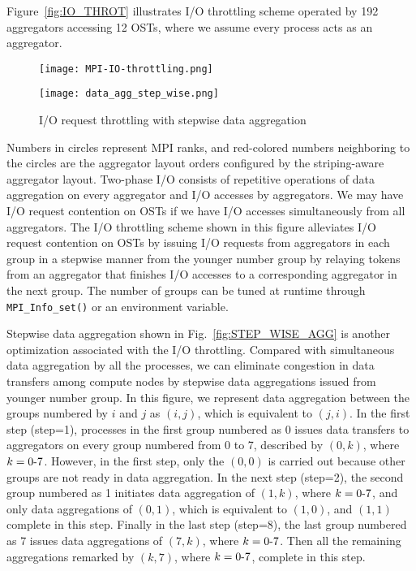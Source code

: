 \documentclass{jhps}
\begin{document}
Figure~\ref{fig:IO_THROT} illustrates
I/O throttling scheme operated by 192 aggregators accessing 12 OSTs,
where we assume every process acts as an aggregator.
%
\begin{figure}[htb]
\centering
\begin{minipage}[b]{0.45\textwidth}
\centering
\texttt{[image: MPI-IO-throttling.png]}
\label{fig:IO_THROT}
\end{minipage}
\noindent
\begin{minipage}[b]{0.45\textwidth}
\centering
\texttt{[image: data\_agg\_step\_wise.png]}
\label{fig:STEP_WISE_AGG}
\end{minipage}
\caption{I/O request throttling with stepwise data aggregation}
\label{fig:IO_THROT_DATA_AGG}
\end{figure}
%
Numbers in circles represent MPI ranks, and red-colored numbers neighboring
to the circles are the aggregator layout orders configured by
the striping-aware aggregator layout.
Two-phase I/O consists of repetitive operations of
data aggregation on every aggregator and I/O accesses by aggregators.
We may have I/O request contention on OSTs
if we have I/O accesses simultaneously from all aggregators.
The I/O throttling scheme shown in this figure alleviates I/O request contention
on OSTs by issuing I/O requests from aggregators in each group in a stepwise manner
from the younger number group by relaying tokens from an aggregator that finishes
I/O accesses to a corresponding aggregator in the next group.
The number of groups can be tuned at runtime through {\tt MPI\_Info\_set()}
or an environment variable.

Stepwise data aggregation shown in
Fig.~\ref{fig:STEP_WISE_AGG}
is another optimization associated with the I/O throttling.
Compared with simultaneous data aggregation by all the processes,
we can eliminate congestion in data transfers among compute nodes
by stepwise data aggregations issued from younger number group.
In this figure, we represent data aggregation between
the groups numbered by $i$ and $j$ as $(i,j)$,
which is equivalent to $(j,i)$.
In the first step (step=1), processes in the first group numbered as 0
issues data transfers to aggregators on every group
numbered from 0 to 7, described by $(0,k)$, where $k=0\mathchar`-7$.
However, in the first step, only the $(0,0)$ is carried out
because other groups are not ready in data aggregation.
In the next step (step=2), the second group numbered as 1 initiates
data aggregation of $(1,k)$, where $k=0\mathchar`-7$,
and only data aggregations of $(0,1)$, which is equivalent to $(1,0)$,
and $(1,1)$ complete in this step.
Finally in the last step (step=8), the last group numbered as 7
issues data aggregations of $(7,k)$, where $k=0\mathchar`-7$.
Then all the remaining aggregations remarked by $(k,7)$,
where $k=0\mathchar`-7$, complete in this step.
\end{document}
